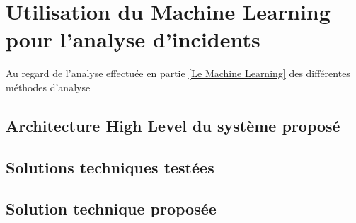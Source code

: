 \chapter{Utilisation du Machine Learning pour l'analyse d'incidents}
\label{Utilisation du Machine Learning pour l'analyse d'incidents}
\thispagestyle{fancy}

Au regard de l'analyse effectuée en partie \ref{Le Machine Learning} des différentes méthodes d'analyse 
\section{Architecture High Level du système proposé}
\label{Utilisation du Machine Learning pour l'analyse d'incidents: Achitecture High Level du système proposé}

\section{Solutions techniques testées}
\label{Utilisation du Machine Learning pour l'analyse d'incidents: Solutions techniques testées}

\section{Solution technique proposée}
\label{Utilisation du Machine Learning pour l'analyse d'incidents: Solution technique proposée}

